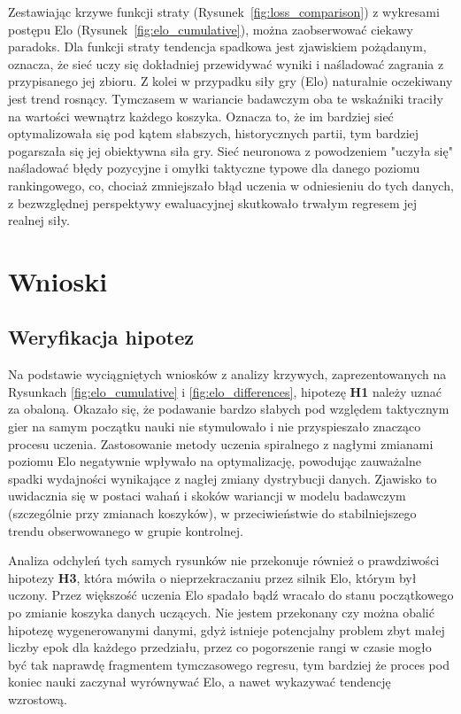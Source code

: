 \documentclass[12pt,a4paper]{report}
\begin{document}
Zestawiając krzywe funkcji straty (Rysunek~\ref{fig:loss_comparison}) z wykresami postępu Elo (Rysunek~\ref{fig:elo_cumulative}), można zaobserwować ciekawy paradoks. Dla funkcji straty tendencja spadkowa jest zjawiskiem pożądanym, oznacza, że sieć uczy się dokładniej przewidywać wyniki i naśladować zagrania z przypisanego jej zbioru. Z kolei w przypadku siły gry (Elo) naturalnie oczekiwany jest trend rosnący. Tymczasem w wariancie badawczym oba te wskaźniki traciły na wartości wewnątrz każdego koszyka. Oznacza to, że im bardziej sieć optymalizowała się pod kątem słabszych, historycznych partii, tym bardziej pogarszała się jej obiektywna siła gry. Sieć neuronowa z powodzeniem "uczyła się" naśladować błędy pozycyjne i omyłki taktyczne typowe dla danego poziomu rankingowego, co, chociaż zmniejszało błąd uczenia w odniesieniu do tych danych, z bezwzględnej perspektywy ewaluacyjnej skutkowało trwałym regresem jej realnej siły.

\chapter{Wnioski}

\section{Weryfikacja hipotez}

Na podstawie wyciągniętych wniosków z analizy krzywych, zaprezentowanych na Rysunkach \ref{fig:elo_cumulative} i \ref{fig:elo_differences}, hipotezę \textbf{H1} należy uznać za obaloną. Okazało się, że podawanie bardzo słabych pod względem taktycznym gier na samym początku nauki nie stymulowało i nie przyspieszało znacząco procesu uczenia. Zastosowanie metody uczenia spiralnego z nagłymi zmianami poziomu Elo negatywnie wpływało na optymalizację, powodując zauważalne spadki wydajności wynikające z nagłej zmiany dystrybucji danych. Zjawisko to uwidacznia się w postaci wahań i skoków wariancji w modelu badawczym (szczególnie przy zmianach koszyków), w przeciwieństwie do stabilniejszego trendu obserwowanego w grupie kontrolnej.

Analiza odchyleń tych samych rysunków nie przekonuje również o prawdziwości hipotezy \textbf{H3}, która mówiła o nieprzekraczaniu przez silnik Elo, którym był uczony. Przez większość uczenia Elo spadało bądź wracało do stanu początkowego po zmianie koszyka danych uczących. Nie jestem przekonany czy można obalić hipotezę wygenerowanymi danymi, gdyż istnieje potencjalny problem zbyt małej liczby epok dla każdego przedziału, przez co pogorszenie rangi w czasie mogło być tak naprawdę fragmentem tymczasowego regresu, tym bardziej że proces pod koniec nauki zaczynał wyrównywać Elo, a nawet wykazywać tendencję wzrostową.
\end{document}
